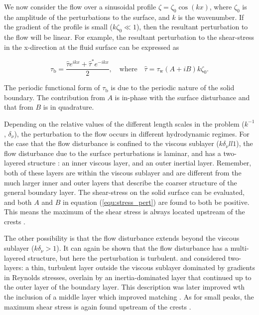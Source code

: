 \documentclass[12pt]{article}
\begin{document}
We now consider the flow over a sinusoidal profile $\zeta = \zeta_{0} \cos (k x)$, where $\zeta_{0}$ is the amplitude of the perturbations to the surface, and $k$ is the wavenumber. If the gradient of the profile is small ($k \zeta_{0} \ll 1$), then the resultant perturbation to the flow will be linear. For example, the resultant perturbation to the shear-stress in the x-direction at the fluid surface can be expressed as \citep{Kroy02, Charru13}

\begin{equation}
\label{equ:stress_pert}
\tau_{\text{b}} = \frac{\hat{\tau} e^{i k x} + \hat{\tau}^{*} e^{-i k x}}{2}, \quad \text{where} \quad \hat{\tau} = \tau_{\text{w}} (A + i B) k \zeta_{0}.
\end{equation} 

The periodic functional form of $\tau_{\text{b}}$ is due to the periodic nature of the solid boundary. The contribution from $A$ is in-phase with the surface disturbance and that from $B$ is in quadrature. 

Depending on the relative values of the different length scales in the problem ($k^{-1}$, $\delta_{\nu}$), the perturbation to the flow occurs in different hydrodynamic regimes. For the case that the flow disturbance is confined to the viscous sublayer ($k \delta_{\nu} ll 1$), the flow disturbance due to the surface perturbations is laminar, and has a two-layered structure \citep{Charru13}: an inner viscous layer, and an outer inertial layer. Remember, both of these layers are within the viscous sublayer and are different from the much larger inner and outer layers that describe the coarser structure of the general boundary layer. The shear-stress on the solid surface can be evaluated, and both $A$ and $B$ in equation (\ref{equ:stress_pert}) are found to both be positive. This means the maximum of the shear stress is always located upstream of the crests \citep{Benjamin58, Charru00, Charru13}. 

The other possibility is that the flow disturbance extends beyond the viscous sublayer ($k \delta_{\nu} > 1$). It can again be shown that the flow disturbance has a multi-layered structure, but here the perturbation is turbulent. \citet{Jackson75} and \citet{Sykes80} considered two-layers: a thin, turbulent layer outside the viscous sublayer dominated by gradients in Reynolds stresses, overlain by an inertia-dominated layer that continued up to the outer layer of the boundary layer. This description was later improved wth the inclusion of a middle layer which improved matching \citep{Hunt88, Belcher98}. As for small peaks, the maximum shear stress is again found upstream of the crests \citep{Hunt88, Belcher98, Kroy02, Charru13}.
\end{document}
